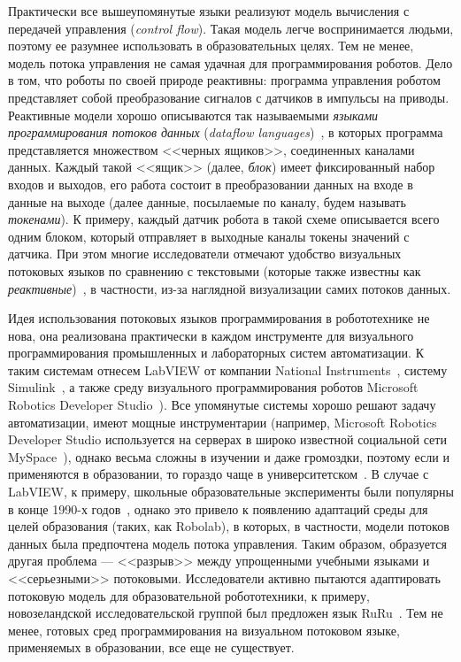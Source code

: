 \documentclass[a5paper]{article}
\begin{document}
Практически все вышеупомянутые языки реализуют модель вычисления с передачей управления (\textit{control flow}). Такая модель легче воспринимается людьми, поэтому ее разумнее использовать в образовательных целях. Тем не менее, модель потока управления не самая удачная для программирования роботов. Дело в том, что роботы по своей природе реактивны: программа управления роботом представляет собой преобразование сигналов с датчиков в импульсы на приводы. Реактивные модели хорошо описываются так называемыми \textit{языками программирования потоков данных} (\textit{dataflow languages})~\cite{johnston2004advances}, в которых программа представляется множеством <<черных ящиков>>, соединенных каналами данных. Каждый такой <<ящик>> (далее, \textit{блок}) имеет фиксированный набор входов и выходов, его работа состоит в преобразовании данных на входе в данные на выходе (далее данные, посылаемые по каналу, будем называть \textit{токенами}). К примеру, каждый датчик робота в такой схеме описывается всего одним блоком, который отправляет в выходные каналы токены значений с датчика. При этом многие исследователи отмечают удобство визуальных потоковых языков по сравнению с текстовыми (которые также известны как \textit{реактивные})~\cite{johnston2004advances}, в частности, из-за наглядной визуализации самих потоков данных.

Идея использования потоковых языков программирования в робототехнике не нова, она реализована практически в каждом инструменте для визуального программирования промышленных и лабораторных систем автоматизации. К таким системам отнесем LabVIEW от компании National Instruments~\cite{kodosky1991visual}, систему Simulink~\cite{dabney2004mastering}, а также среду визуального программирования роботов Microsoft Robotics Developer Studio~\cite{jackson2007microsoft}). Все упомянутые системы хорошо решают задачу автоматизации, имеют мощные инструментарии (например, Microsoft Robotics Developer Studio используется на серверах в широко известной социальной сети MySpace~\cite{scherotter2009ccr}), однако весьма сложны в изучении и даже громоздки, поэтому если и применяются в образовании, то гораздо чаще в университетском~\cite{stefanovic2011labview,yi2005labview}. В случае с LabVIEW, к примеру, школьные образовательные эксперименты были популярны в конце 1990-х годов~\cite{cyr1997low,portsmore1999robolab}, однако это привело к появлению адаптаций среды для целей образования (таких, как Robolab), в которых, в частности, модели потоков данных была предпочтена модель потока управления. Таким образом, образуется другая проблема --- <<разрыв>> между упрощенными учебными языками и <<серьезными>> потоковыми. Исследователи активно пытаются адаптировать потоковую модель для образовательной робототехники, к примеру, новозеландской исследовательской группой был предложен язык RuRu~\cite{diprose2011ruru}. Тем не менее, готовых сред программирования на визуальном потоковом языке, применяемых в образовании, все еще не существует.
\end{document}
